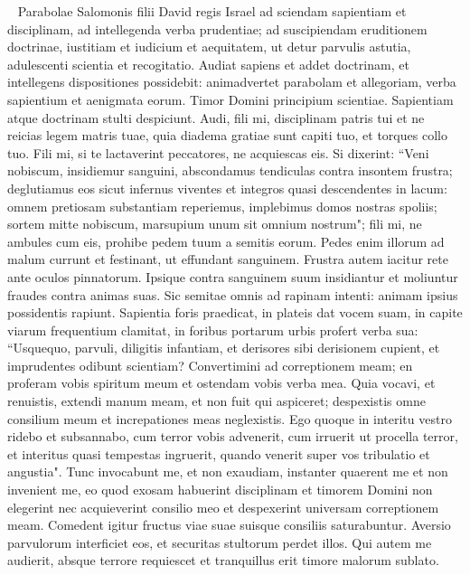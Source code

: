 
\begin{biblechapter}   
\verse Parabolae Salomonis filii David regis Israel 
\verse ad sciendam sapientiam et disciplinam, ad intellegenda verba prudentiae; 
\verse ad suscipiendam eruditionem doctrinae, iustitiam et iudicium et aequitatem, 
\verse ut detur parvulis astutia, adulescenti scientia et recogitatio. 
\verse Audiat sapiens et addet doctrinam, et intellegens dispositiones possidebit: 
\verse animadvertet parabolam et allegoriam, verba sapientium et aenigmata eorum. 
\verse Timor Domini principium scientiae. Sapientiam atque doctrinam stulti despiciunt. 
\verse Audi, fili mi, disciplinam patris tui et ne reicias legem matris tuae, 
\verse quia diadema gratiae sunt capiti tuo, et torques collo tuo. 
\verse Fili mi, si te lactaverint peccatores, ne acquiescas eis. 
\verse Si dixerint: “Veni nobiscum, insidiemur sanguini, abscondamus tendiculas contra insontem frustra; 
\verse deglutiamus eos sicut infernus viventes et integros quasi descendentes in lacum: 
\verse omnem pretiosam substantiam reperiemus, implebimus domos nostras spoliis; 
\verse sortem mitte nobiscum, marsupium unum sit omnium nostrum"; 
\verse fili mi, ne ambules cum eis, prohibe pedem tuum a semitis eorum. 
\verse Pedes enim illorum ad malum currunt et festinant, ut effundant sanguinem. 
\verse Frustra autem iacitur rete ante oculos pinnatorum. 
\verse Ipsique contra sanguinem suum insidiantur et moliuntur fraudes contra animas suas. 
\verse Sic semitae omnis ad rapinam intenti: animam ipsius possidentis rapiunt. 
\verse Sapientia foris praedicat, in plateis dat vocem suam, 
\verse in capite viarum frequentium clamitat, in foribus portarum urbis profert verba sua: 
\verse “Usquequo, parvuli, diligitis infantiam, et derisores sibi derisionem cupient, et imprudentes odibunt scientiam? 
\verse Convertimini ad correptionem meam; en proferam vobis spiritum meum et ostendam vobis verba mea. 
\verse Quia vocavi, et renuistis, extendi manum meam, et non fuit qui aspiceret; 
\verse despexistis omne consilium meum et increpationes meas neglexistis. 
\verse Ego quoque in interitu vestro ridebo et subsannabo, cum terror vobis advenerit, 
\verse cum irruerit ut procella terror, et interitus quasi tempestas ingruerit, quando venerit super vos tribulatio et angustia". 
\verse Tunc invocabunt me, et non exaudiam, instanter quaerent me et non invenient me, 
\verse eo quod exosam habuerint disciplinam et timorem Domini non elegerint 
\verse nec acquieverint consilio meo et despexerint universam correptionem meam. 
\verse Comedent igitur fructus viae suae suisque consiliis saturabuntur. 
\verse Aversio parvulorum interficiet eos, et securitas stultorum perdet illos. 
\verse Qui autem me audierit, absque terrore requiescet et tranquillus erit timore malorum sublato. 
\end{biblechapter}

